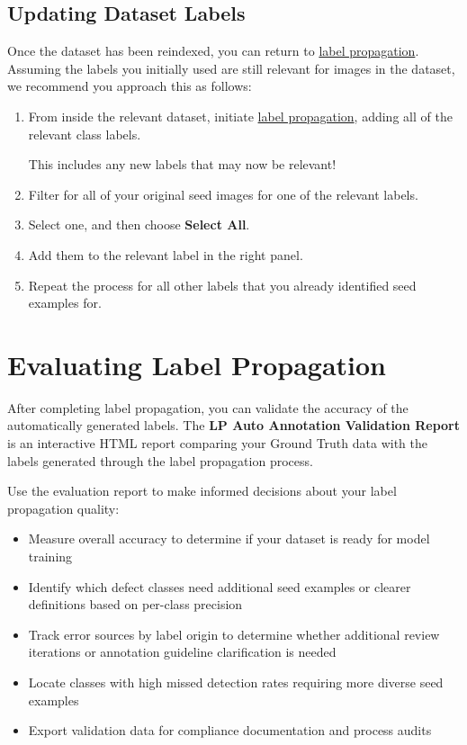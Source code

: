 \documentclass[
  11pt,
  a4paper,
  11pt,
  oneside]{report}
\providecommand{\tightlist}{%
  \setlength{\itemsep}{0pt}\setlength{\parskip}{0pt}}
\begin{document}
\section{Updating Dataset Labels}\label{updating-dataset-labels}

Once the dataset has been reindexed, you can return to
\hyperref[re-indexing-the-updated-dataset]{label propagation}. Assuming
the labels you initially used are still relevant for images in the
dataset, we recommend you approach this as follows:

\begin{enumerate}
\def\labelenumi{\arabic{enumi}.}
\item
  From inside the relevant dataset, initiate
  \hyperref[re-indexing-the-updated-dataset]{label propagation}, adding
  all of the relevant class labels.

  This includes any new labels that may now be relevant!
\item
  Filter for all of your original seed images for one of the relevant
  labels.
\item
  Select one, and then choose \textbf{Select All}.
\item
  Add them to the relevant label in the right panel.
\item
  Repeat the process for all other labels that you already identified
  seed examples for.
\end{enumerate}

\chapter{Evaluating Label
Propagation}\label{evaluating-label-propagation}

After completing label propagation, you can validate the accuracy of the
automatically generated labels. The \textbf{LP Auto Annotation
Validation Report} is an interactive HTML report comparing your Ground
Truth data with the labels generated through the label propagation
process.

Use the evaluation report to make informed decisions about your label
propagation quality:

\begin{itemize}
\tightlist
\item
  Measure overall accuracy to determine if your dataset is ready for
  model training
\item
  Identify which defect classes need additional seed examples or clearer
  definitions based on per-class precision
\item
  Track error sources by label origin to determine whether additional
  review iterations or annotation guideline clarification is needed
\item
  Locate classes with high missed detection rates requiring more diverse
  seed examples
\item
  Export validation data for compliance documentation and process audits
\end{itemize}
\end{document}
